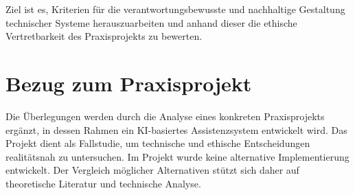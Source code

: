 Ziel ist es, Kriterien für die verantwortungsbewusste und nachhaltige Gestaltung technischer Systeme herauszuarbeiten und anhand dieser die ethische Vertretbarkeit des Praxisprojekts zu bewerten.

\section{Bezug zum Praxisprojekt}
Die Überlegungen werden durch die Analyse eines konkreten Praxisprojekts ergänzt, in dessen Rahmen ein KI-basiertes Assistenzsystem entwickelt wird. Das Projekt dient als Fallstudie, um technische und ethische Entscheidungen realitätsnah zu untersuchen. Im Projekt wurde keine alternative Implementierung entwickelt. Der Vergleich möglicher Alternativen stützt sich daher auf theoretische Literatur und technische Analyse.